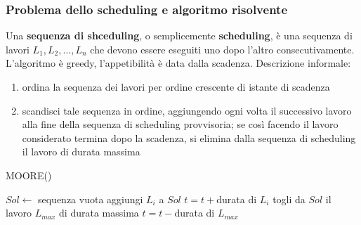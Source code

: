 \documentclass[11pt]{article}
\begin{document}
\subsubsection{Problema dello scheduling e algoritmo risolvente}
Una \textbf{sequenza di shceduling}, o semplicemente \textbf{scheduling}, è una sequenza di lavori $L_1,L_2,\dots,L_n$ che 
devono essere eseguiti uno dopo l'altro consecutivamente. L'algoritmo è greedy, l'appetibilità è data dalla scadenza. 
Descrizione informale:
\begin{enumerate}
    \item ordina la sequenza dei lavori per ordine crescente di istante di scadenza 
    \item scandisci tale sequenza in ordine, aggiungendo ogni volta il successivo lavoro alla fine della sequenza di scheduling 
    provvisoria; se così facendo il lavoro considerato termina dopo la scadenza, si elimina dalla sequenza di scheduling 
    il lavoro di durata massima 
\end{enumerate}
\begin{algorithm}
    \caption{MOORE()}
    \begin{algorithmic}
        \State $Sol \gets$ sequenza vuota
        \State aggiungi $L_i$ a $Sol$
        \State $t=t+$durata di $L_i$
                \State togli da $Sol$ il lavoro $L_{max}$ di durata massima 
                \State $t=t-$durata di $L_{max}$
            \EndIf 
        \EndFor
    \end{algorithmic}
\end{algorithm}
\end{document}
